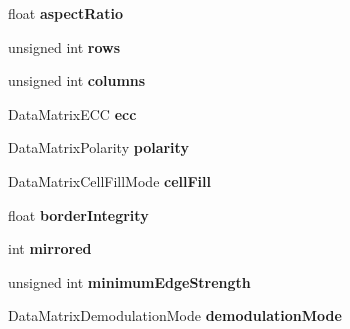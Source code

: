 \begin{DoxyCompactItemize}
\item 
\hypertarget{structDataMatrixReport__struct_a8cd14370c454a773054d1a69ee977d00}{float {\bfseries aspect\-Ratio}}\label{structDataMatrixReport__struct_a8cd14370c454a773054d1a69ee977d00}

\item 
\hypertarget{structDataMatrixReport__struct_a2505df96b14f569f052534b3c0cf7265}{unsigned int {\bfseries rows}}\label{structDataMatrixReport__struct_a2505df96b14f569f052534b3c0cf7265}

\item 
\hypertarget{structDataMatrixReport__struct_a01d1eade1620ee10437dfbaef3706880}{unsigned int {\bfseries columns}}\label{structDataMatrixReport__struct_a01d1eade1620ee10437dfbaef3706880}

\item 
\hypertarget{structDataMatrixReport__struct_aa481777742b099796cc8c4d2e5326738}{\-Data\-Matrix\-E\-C\-C {\bfseries ecc}}\label{structDataMatrixReport__struct_aa481777742b099796cc8c4d2e5326738}

\item 
\hypertarget{structDataMatrixReport__struct_a97cc5dc819721b7126dbd2709a754af7}{\-Data\-Matrix\-Polarity {\bfseries polarity}}\label{structDataMatrixReport__struct_a97cc5dc819721b7126dbd2709a754af7}

\item 
\hypertarget{structDataMatrixReport__struct_a5e71d3f51bf02da4224eba502ffa2395}{\-Data\-Matrix\-Cell\-Fill\-Mode {\bfseries cell\-Fill}}\label{structDataMatrixReport__struct_a5e71d3f51bf02da4224eba502ffa2395}

\item 
\hypertarget{structDataMatrixReport__struct_a369902b5e6013b0b8d0fee58f545ec18}{float {\bfseries border\-Integrity}}\label{structDataMatrixReport__struct_a369902b5e6013b0b8d0fee58f545ec18}

\item 
\hypertarget{structDataMatrixReport__struct_af087371d89d8932b744cfaeb2d659a6c}{int {\bfseries mirrored}}\label{structDataMatrixReport__struct_af087371d89d8932b744cfaeb2d659a6c}

\item 
\hypertarget{structDataMatrixReport__struct_aed6d8e91a32785cf3eac6ebe13c0cbf9}{unsigned int {\bfseries minimum\-Edge\-Strength}}\label{structDataMatrixReport__struct_aed6d8e91a32785cf3eac6ebe13c0cbf9}

\item 
\hypertarget{structDataMatrixReport__struct_afd798f570cca5bde66948f3bec9fcec0}{\-Data\-Matrix\-Demodulation\-Mode {\bfseries demodulation\-Mode}}\label{structDataMatrixReport__struct_afd798f570cca5bde66948f3bec9fcec0}


\end{DoxyCompactItemize}
